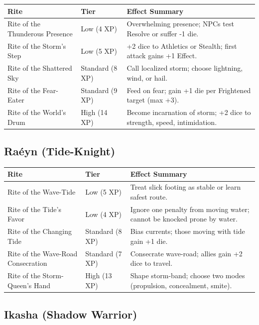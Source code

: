 \begin{longtable}{p{} p{} p{}}
\hline
\textbf{Rite} & \textbf{Tier} & \textbf{Effect Summary} \\
\hline
Rite of the Thunderous Presence & Low (4 XP) & Overwhelming presence; NPCs test Resolve or suffer -1 die. \\
Rite of the Storm's Step & Low (5 XP) & +2 dice to Athletics or Stealth; first attack gains +1 Effect. \\
Rite of the Shattered Sky & Standard (8 XP) & Call localized storm; choose lightning, wind, or hail. \\
Rite of the Fear-Eater & Standard (9 XP) & Feed on fear; gain +1 die per Frightened target (max +3). \\
Rite of the World's Drum & High (14 XP) & Become incarnation of storm; +2 dice to strength, speed, intimidation. \\
\hline
\end{longtable}

\subsection{Raéyn (Tide-Knight)}

\begin{longtable}{p{} p{} p{}}
\hline
\textbf{Rite} & \textbf{Tier} & \textbf{Effect Summary} \\
\hline
Rite of the Wave-Tide & Low (5 XP) & Treat slick footing as stable or learn safest route. \\
Rite of the Tide's Favor & Low (4 XP) & Ignore one penalty from moving water; cannot be knocked prone by water. \\
Rite of the Changing Tide & Standard (8 XP) & Bias currents; those moving with tide gain +1 die. \\
Rite of the Wave-Road Consecration & Standard (7 XP) & Consecrate wave-road; allies gain +2 dice to travel. \\
Rite of the Storm-Queen's Hand & High (13 XP) & Shape storm-band; choose two modes (propulsion, concealment, smite). \\
\hline
\end{longtable}

\subsection{Ikasha (Shadow Warrior)}

